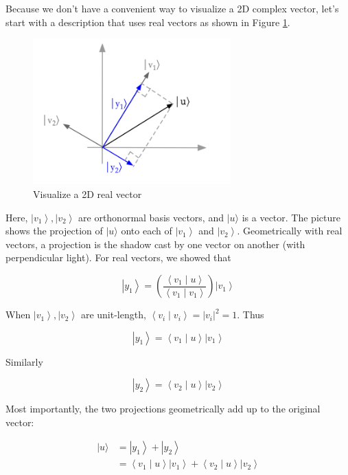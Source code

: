 \documentclass[main.tex]{subfiles}
\begin{document}
    Because we don't have a convenient way to visualize a 2D complex vector, let's start with a description that uses real vectors as shown in Figure \ref{fig:11dirac6}.
    
    \begin{figure}
        \centering
        \includegraphics[width=3in]{notes/figs/n04/12projection.png}
        \caption{Visualize a 2D real vector}
        \label{fig:11dirac6}
    \end{figure}
    
    Here, $\left|v_{1}\right\rangle,\left|v_{2}\right\rangle$ are orthonormal basis vectors, and $|u\rangle$ is a vector. The picture shows the projection of $|u\rangle$ onto each of $\left|v_{1}\right\rangle$ and $\left|v_{2}\right\rangle$. Geometrically with real vectors, a projection is the shadow cast by one vector on another (with perpendicular light). For real vectors, we showed that
    
    $$
    \left|y_{1}\right\rangle=\left(\frac{\left\langle v_{1} \mid u\right\rangle}{\left\langle v_{1} \mid v_{1}\right\rangle}\right)\left|v_{1}\right\rangle
    $$
    
    When $\left|v_{1}\right\rangle,\left|v_{2}\right\rangle$ are unit-length, $\left\langle v_{i} \mid v_{i}\right\rangle=\left|v_{i}\right|^{2}=1$. Thus

    $$
    \left|y_{1}\right\rangle=\left\langle v_{1} \mid u\right\rangle\left|v_{1}\right\rangle
    $$

    Similarly
    
    $$
    \left|y_{2}\right\rangle=\left\langle v_{2} \mid u\right\rangle\left|v_{2}\right\rangle
    $$
    
    Most importantly, the two projections geometrically add up to the original vector:
    
    $$
    \begin{aligned}
    |u\rangle &=\left|y_{1}\right\rangle+\left|y_{2}\right\rangle \\
    &=\left\langle v_{1} \mid u\right\rangle\left|v_{1}\right\rangle+\left\langle v_{2} \mid u\right\rangle\left|v_{2}\right\rangle
    \end{aligned}
    $$
    
\end{document}
